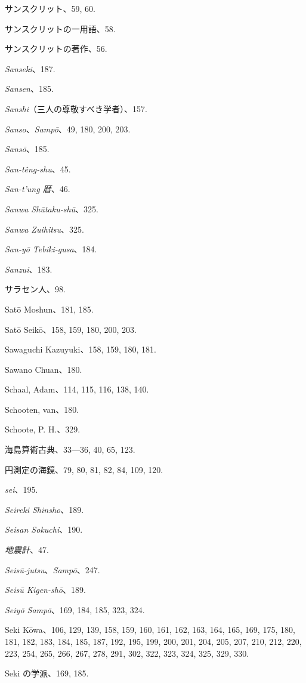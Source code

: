 \documentclass[11pt]{article}
\begin{document}
サンスクリット、59, 60.\par
サンスクリットの一用語、58.\par
サンスクリットの著作、56.\par
\emph{Sanseki}、187.\par
\emph{Sansen}、185.\par
\emph{Sanshi}（三人の尊敬すべき学者）、157.\par
\emph{Sanso}、\emph{Sampō}、49, 180, 200, 203.\par
\emph{Sansō}、185.\par
\emph{San-têng-shu}、45.\par
\emph{San-t'ung 暦}、46.\par
\emph{Sanwa Shūtaku-shū}、325.\par
\emph{Sanwa Zuihitsu}、325.\par
\emph{San-yō Tebiki-gusa}、184.\par
\emph{Sanzui}、183.\par
サラセン人、98.\par
Satō Moshun、181, 185.\par
Satō Seikō、158, 159, 180, 200, 203.\par
Sawaguchi Kazuyuki、158, 159, 180, 181.\par
Sawano Chuan、180.\par
Schaal, Adam、114, 115, 116, 138, 140.\par
Schooten, van、180.\par
Schoote, P. H.、329.\par
海島算術古典、33—36, 40, 65, 123.\par
円測定の海鏡、79, 80, 81, 82, 84, 109, 120.\par
\emph{sei}、195.\par
\emph{Seireki Shinsho}、189.\par
\emph{Seisan Sokuchi}、190.\par
\emph{地震計}、47.\par
\emph{Seisū-jutsu}、\emph{Sampō}、247.\par
\emph{Seisū Kigen-shō}、189.\par
\emph{Seiyō Sampō}、169, 184, 185, 323, 324.\par
Seki Kōwa、106, 129, 139, 158, 159, 160, 161, 162, 163, 164, 165, 169, 175, 180, 181, 182, 183, 184, 185, 187, 192, 195, 199, 200, 201, 204, 205, 207, 210, 212, 220, 223, 254, 265, 266, 267, 278, 291, 302, 322, 323, 324, 325, 329, 330.\par
Seki の学派、169, 185.\par
\end{document}
